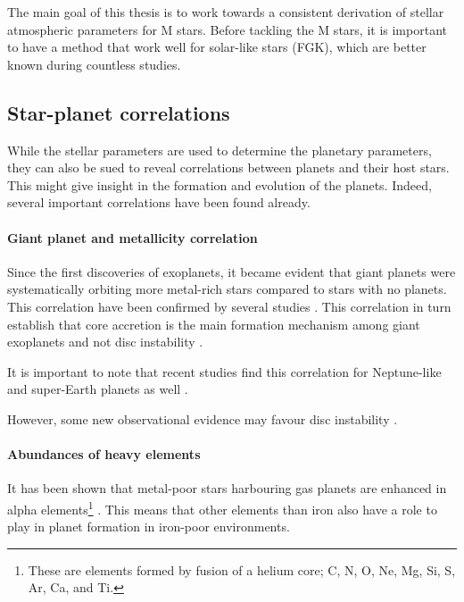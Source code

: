 The main goal of this thesis is to work towards a consistent derivation of stellar atmospheric
parameters for M stars. Before tackling the M stars, it is important to have a method that work well
for solar-like stars (FGK), which are better known during countless studies.

\subsection{Star-planet correlations}

While the stellar parameters are used to determine the planetary parameters, they can also be sued
to reveal correlations between planets and their host stars. This might give insight in the
formation and evolution of the planets. Indeed, several important correlations have been found
already.

\paragraph{Giant planet and metallicity correlation}

Since the first discoveries of exoplanets, it became evident that giant planets were systematically
orbiting more metal-rich stars compared to stars with no planets. This correlation have been
confirmed by several studies \citep{Gonzalez1997,Santos2004,Fischer2005,Sousa2008a,Mortier2013b}.
This correlation in turn establish that core accretion is the main formation mechanism among giant
exoplanets \citep{Pollack1996,Ida2004,Mordasini2012} and not disc instability \citep{Boss2002}.

It is important to note that recent studies find this correlation for Neptune-like and
super-Earth planets as well \citep{Wang2015,Zhu2016}.

However, some new observational evidence \citep{Santos2017} may favour disc instability
\citep{Nayakshin2017}.

\paragraph{Abundances of heavy elements}

It has been shown that metal-poor stars harbouring gas planets are enhanced in alpha
elements\footnote{These are elements formed by fusion of a helium core; C, N, O, Ne, Mg, Si, S, Ar,
Ca, and Ti.} \citep[see e.g.][]{Adibekyan2012a}. This means that other elements than iron also have
a role to play in planet formation in iron-poor environments.


